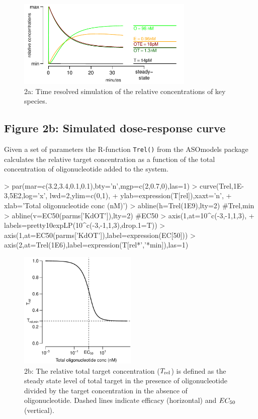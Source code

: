 \documentclass{article}
\newenvironment{Ncenter}{%
  \setlength\topsep{-10pt}
  \setlength\parskip{-100pt}
  \begin{center}
}{%
  \end{center}
}
\newcommand{\Trel}{T_{\rm{rel}}}
\newcommand{\EC}{EC_{\rm{50}}}
\begin{document}
\begin{figure}[!h]
\begin{Ncenter}
\includegraphics[width=0.75\textwidth]{Vignette2-Fig1}
\end{Ncenter}
\caption{2a: Time resolved simulation of the relative concentrations of key species.}
\end{figure}

\subsection*{Figure 2b: Simulated dose-response curve}
Given a set of parameters the R-function \texttt{Trel()} from the ASOmodels package calculates the relative target concentration as a function of the total concentration of oligonucleotide added to the system.
\begin{Schunk}
\begin{Sinput}
> par(mar=c(3.2,3.4,0.1,0.1),bty='n',mgp=c(2,0.7,0),las=1)
> curve(Trel,1E-3,5E2,log='x', lwd=2,ylim=c(0,1),
+       ylab=expression(T[rel]),xaxt='n',
+       xlab='Total oligonucleotide conc (nM)')
> abline(h=Trel(1E9),lty=2) #Trel,min
> abline(v=EC50(parms['KdOT']),lty=2) #EC50
> axis(1,at=10^c(-3,-1,1,3),
+      labels=pretty10expLP(10^c(-3,-1,1,3),drop.1=T))
> axis(1,at=EC50(parms['KdOT']),label=expression(EC[50]))
> axis(2,at=Trel(1E6),label=expression(T[rel*','*min]),las=1)
\end{Sinput}
\end{Schunk}
\begin{figure}[!h]
\begin{Ncenter}
\includegraphics[width=0.5\textwidth]{Vignette2-Fig2}
\end{Ncenter}
\caption{2b: The relative total target concentration ($\Trel$) is defined as the steady state level of total target in the presence of oligonucleotide divided by the target concentration in the absence of oligonucleotide. Dashed lines indicate efficacy (horizontal) and $\EC$ (vertical).}
\end{figure}
\end{document}
